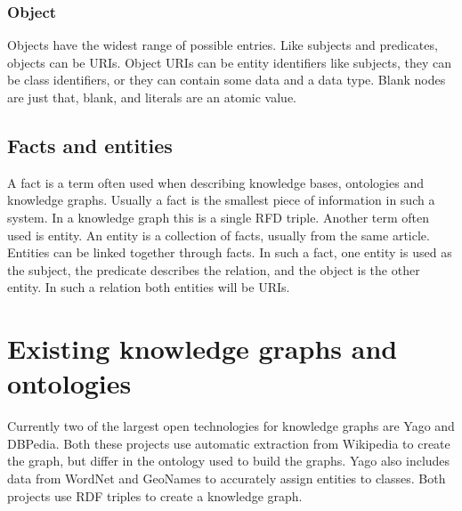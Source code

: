 \subsubsection{Object}
Objects have the widest range of possible entries. Like subjects and predicates, objects can be URIs. Object URIs can be entity identifiers like subjects, they can be class identifiers, or they can contain some data and a data type. Blank nodes are just that, blank, and literals are an atomic value. 

\subsection{Facts and entities}
A fact is a term often used when describing knowledge bases, ontologies and knowledge graphs. Usually a fact is the smallest piece of information in such a system. In a knowledge graph this is a single RFD triple. Another term often used is entity. An entity is a collection of facts, usually from the same article. Entities can be linked together through facts. In such a fact, one entity is used as the subject, the predicate describes the relation, and the object is the other entity. In such a relation both entities will be URIs.



\section{Existing knowledge graphs and ontologies}
Currently two of the largest open technologies for knowledge graphs are Yago and DBPedia. Both these projects use automatic extraction from Wikipedia to create the graph, but differ in the ontology used to build the graphs. Yago also includes data from WordNet and GeoNames to accurately assign entities to classes. Both projects use RDF triples to create a knowledge graph.\\



